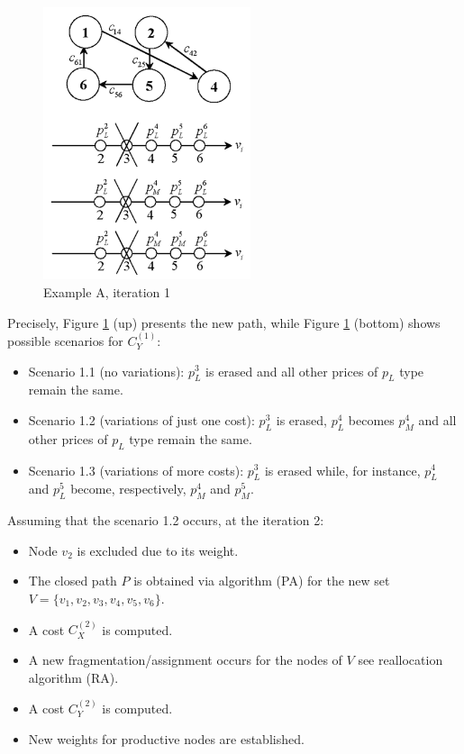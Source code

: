 \begin{figure}[h]
    \centering
    \includegraphics[height=8cm, keepaspectratio]{images/exempleA-it1}
    \caption{Example A, iteration 1}
    \label{fig:exempleA-it1}
\end{figure}
Precisely, Figure \ref{fig:exempleA-it1} (up) presents the new path, while Figure \ref{fig:exempleA-it1} (bottom) shows possible scenarios for $C^{(1)}_Y$:
\begin{itemize}
    \item Scenario 1.1 (no variations): $p^3_L$ is erased and all other prices of $p_L$ type remain the same.
    \item Scenario 1.2 (variations of just one cost): $p^3_L$ is erased, $p^4_L$ becomes $p^4_M$ and all other prices of $p_L$ type remain the same.
    \item Scenario 1.3 (variations of more costs): $p^3_L$  is erased while, for instance, $p^4_L$ and $p^5_L$ become, respectively, $p^4_M$ and $p^5_M$.
\end{itemize}

Assuming that the scenario 1.2 occurs, at the iteration 2:
\begin{itemize}
    \item Node $v_2$ is excluded due to its weight.
    \item The closed path $P$ is obtained via algorithm (PA) for the new set $V = \{v_1,v_2,v_3,v_4, v_5, v_6\}$.
    \item A cost $C_X^{(2)}$ is computed.
    \item A new fragmentation/assignment occurs for the nodes of $V$ see reallocation algorithm (RA).
    \item A cost $C^{(2)}_Y$ is computed.
    \item New weights for productive nodes are established.
\end{itemize}

